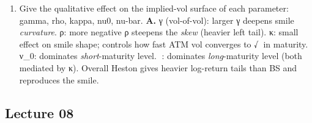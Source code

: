 \documentclass[
  11pt,
]{article}
\begin{document}
\begin{enumerate}
  κ(−x)f'+½γ²xf'\,' is matched against the squared-Bessel generator
  nf'+2xf'\,', whose Laplace transform of the time-integral is known
  (Pitman--Yor). (ii) Time change s=γ²t/4 rescales the
  \emph{second-order} coefficient ½γ²x onto the squared-Bessel value 2x.
  (iii) Girsanov change of measure absorbs the remaining \emph{drift}
  discrepancy (κ(−x) vs n), expressing the CIR integrated-variance
  transform as a ratio of squared-Bessel transforms --- giving the
  Bessel-ratio formula for the cf.
\item
  Give the qualitative effect on the implied-vol surface of each
  parameter: gamma, rho, kappa, nu0, nu-bar. \textbf{A.} γ (vol-of-vol):
  larger γ deepens smile \emph{curvature}. ρ: more negative ρ steepens
  the \emph{skew} (heavier left tail). κ: small effect on smile shape;
  controls how fast ATM vol converges to √ in maturity. ν\_0: dominates
  \emph{short}-maturity level. : dominates \emph{long}-maturity level
  (both mediated by κ). Overall Heston gives heavier log-return tails
  than BS and reproduces the smile.
\end{enumerate}

\hypertarget{lecture-08}{%
\subsection{Lecture 08}\label{lecture-08}}
\end{document}
